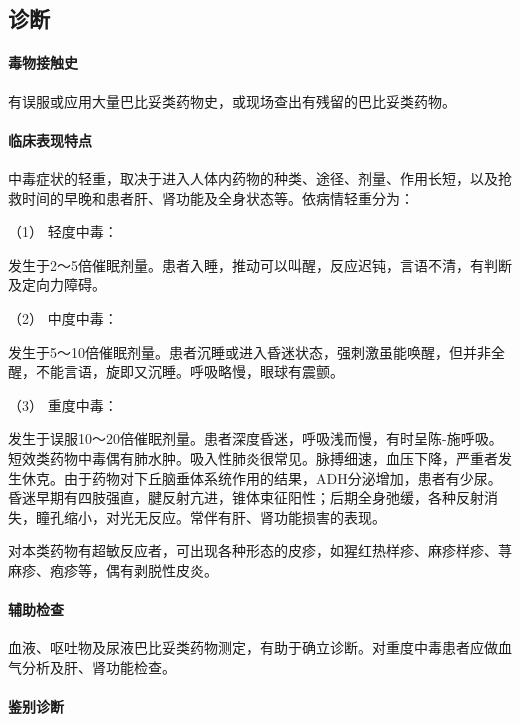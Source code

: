 \subsection{诊断}

\paragraph{毒物接触史}

有误服或应用大量巴比妥类药物史，或现场查出有残留的巴比妥类药物。

\paragraph{临床表现特点}

中毒症状的轻重，取决于进入人体内药物的种类、途径、剂量、作用长短，以及抢救时间的早晚和患者肝、肾功能及全身状态等。依病情轻重分为：

\hypertarget{text00132.htmlux5cux23CHP5-2-2-2-2-2-1}{}
（1） 轻度中毒：

发生于2～5倍催眠剂量。患者入睡，推动可以叫醒，反应迟钝，言语不清，有判断及定向力障碍。

\hypertarget{text00132.htmlux5cux23CHP5-2-2-2-2-2-2}{}
（2） 中度中毒：

发生于5～10倍催眠剂量。患者沉睡或进入昏迷状态，强刺激虽能唤醒，但并非全醒，不能言语，旋即又沉睡。呼吸略慢，眼球有震颤。

\hypertarget{text00132.htmlux5cux23CHP5-2-2-2-2-2-3}{}
（3） 重度中毒：

发生于误服10～20倍催眠剂量。患者深度昏迷，呼吸浅而慢，有时呈陈-施呼吸。短效类药物中毒偶有肺水肿。吸入性肺炎很常见。脉搏细速，血压下降，严重者发生休克。由于药物对下丘脑垂体系统作用的结果，ADH分泌增加，患者有少尿。昏迷早期有四肢强直，腱反射亢进，锥体束征阳性；后期全身弛缓，各种反射消失，瞳孔缩小，对光无反应。常伴有肝、肾功能损害的表现。

对本类药物有超敏反应者，可出现各种形态的皮疹，如猩红热样疹、麻疹样疹、荨麻疹、疱疹等，偶有剥脱性皮炎。

\paragraph{辅助检查}

血液、呕吐物及尿液巴比妥类药物测定，有助于确立诊断。对重度中毒患者应做血气分析及肝、肾功能检查。

\paragraph{鉴别诊断}

